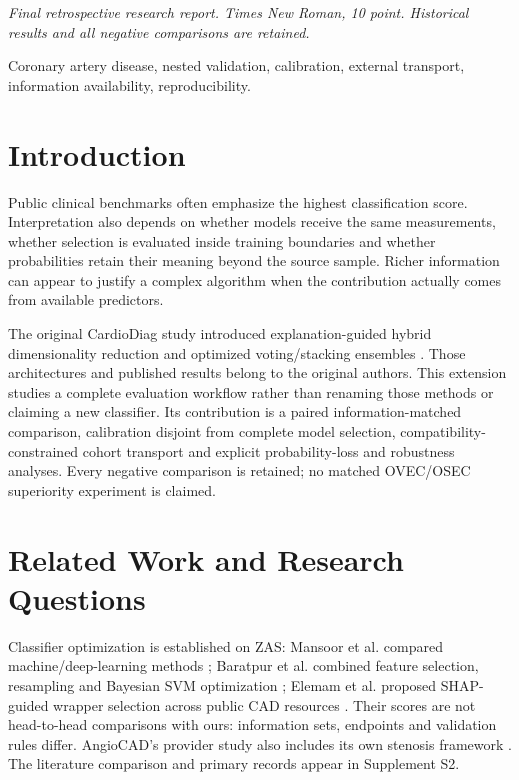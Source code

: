 \documentclass[conference,10pt]{IEEEtran}
\begin{document}
\noindent\textit{Final retrospective research report. Times New Roman, 10 point. Historical results and all negative comparisons are retained.}\par
\begin{IEEEkeywords}
Coronary artery disease, nested validation, calibration, external transport, information availability, reproducibility.

\end{IEEEkeywords}
\section{Introduction}
Public clinical benchmarks often emphasize the highest classification score. Interpretation also depends on whether models receive the same measurements, whether selection is evaluated inside training boundaries and whether probabilities retain their meaning beyond the source sample. Richer information can appear to justify a complex algorithm when the contribution actually comes from available predictors.

The original CardioDiag study introduced explanation-guided hybrid dimensionality reduction and optimized voting/stacking ensembles \cite{r1}. Those architectures and published results belong to the original authors. This extension studies a complete evaluation workflow rather than renaming those methods or claiming a new classifier. Its contribution is a paired information-matched comparison, calibration disjoint from complete model selection, compatibility-constrained cohort transport and explicit probability-loss and robustness analyses. Every negative comparison is retained; no matched OVEC/OSEC superiority experiment is claimed.

\section{Related Work and Research Questions}
Classifier optimization is established on ZAS: Mansoor et al. compared machine/deep-learning methods \cite{r11}; Baratpur et al. combined feature selection, resampling and Bayesian SVM optimization \cite{r12}; Elemam et al. proposed SHAP-guided wrapper selection across public CAD resources \cite{r13}. Their scores are not head-to-head comparisons with ours: information sets, endpoints and validation rules differ. AngioCAD's provider study also includes its own stenosis framework \cite{r14}. The literature comparison and primary records appear in Supplement S2.
\end{document}
